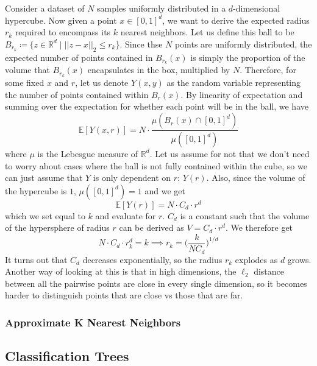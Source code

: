 \documentclass{article}
\begin{document}
    \begin{example}
      Consider a dataset of $N$ samples uniformly distributed in a $d$-dimensional hypercube. Now given a point $x \in [0, 1]^d$, we want to derive the expected radius $r_k$ required to encompass its $k$ nearest neighbors. Let us define this ball to be $B_{r_k} \coloneqq \{ z \in \mathbb{R}^d \mid ||z - x ||_2 \leq r_k \}$. Since thse $N$ points are uniformly distributed, the expected number of points contained in $B_{r_k} (x)$ is simply the proportion of the volume that $B_{r_k} (x)$ encapsulates in the box, multiplied by $N$. Therefore, for some fixed $x$ and $r$, let us denote $Y(x, y)$ as the random variable representing the number of points contained within $B_r (x)$. By linearity of expectation and summing over the expectation for whether each point will be in the ball, we have 
      \[\mathbb{E}[Y (x, r)] = N \cdot \frac{\mu(B_r (x) \cap [0, 1]^d) }{\mu([0, 1]^d)}\]
      where $\mu$ is the Lebesgue measure of $\mathbb{R}^d$. Let us assume for not that we don't need to worry about cases where the ball is not fully contained within the cube, so we can just assume that $Y$ is only dependent on $r$: $Y(r)$. Also, since the volume of the hypercube is $1$,  $\mu([0, 1]^d) = 1$ and we get 
      \[\mathbb{E}[Y(r)] = N \cdot C_d \cdot r^d\]
      which we set equal to $k$ and evaluate for $r$. $C_d$ is a constant such that the volume of the hypersphere of radius $r$ can be derived as $V = C_d \cdot r^d$. We therefore get 
      \[N \cdot C_d \cdot r_k^d = k \implies r_k = \bigg( \frac{k}{N C_d} \bigg)^{1/d}\]
      It turns out that $C_d$ decreases exponentially, so the radius $r_k$ explodes as $d$ grows. Another way of looking at this is that in high dimensions, the $\ell_2$ distance between all the pairwise points are close in every single dimension, so it becomes harder to distinguish points that are close vs those that are far.  
    \end{example} 

    \subsubsection{Approximate K Nearest Neighbors}

  \subsection{Classification Trees}
\end{document}
